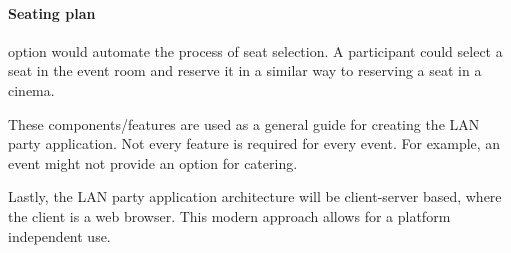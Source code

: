 \paragraph{Seating plan} option would automate the process of seat selection.
A participant could select a seat in the event room and reserve it in a similar way to reserving a seat in a cinema.

These components/features are used as a general guide for creating the \ac{LAN} party application.
Not every feature is required for every event.
For example, an event might not provide an option for catering.

Lastly, the \ac{LAN} party application architecture will be client-server based, where the client is a web browser.
This modern approach allows for a platform independent use.